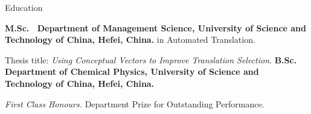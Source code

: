 \begin{rubric}{Education}

\entry*[2018 -- Now]%
	\textbf{M.Sc.~ Department of Management Science, University of Science and Technology of China, Hefei, China.} in Automated Translation.\par
	Thesis title: \emph{Using Conceptual Vectors to Improve Translation Selection}.
%
\entry*[2014 -- 2018]%
	\textbf{B.Sc.~ Department of Chemical Physics, University of Science and Technology of China, Hefei, China.}\par
	\emph{First Class Honours.}  Department Prize for Outstanding Performance.
\end{rubric}
